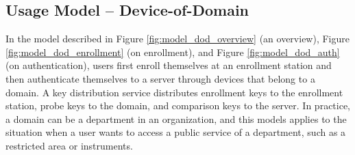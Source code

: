 
\subsection{Usage Model – Device-of-Domain}
\label{sec:dod_model}

In the model described in Figure \ref{fig:model_dod_overview} (an overview), Figure \ref{fig:model_dod_enrollment} (on enrollment), and Figure \ref{fig:model_dod_auth} (on authentication), users first enroll themselves at an enrollment station and then authenticate themselves to a server through devices that belong to a domain.
A key distribution service distributes enrollment keys to the enrollment station, probe keys to the domain, and comparison keys to the server. In practice, a domain can be a department in an organization, and this models applies to the situation when a user wants to access a public service of a department, such as a restricted area or instruments. 

